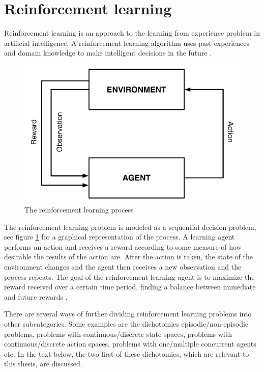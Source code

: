 \section{Reinforcement learning}

Reinforcement learning is an approach to the learning from experience problem in artificial intelligence. A reinforcement learning algorithm uses past experiences and domain knowledge to make intelligent decisions in the future \parencite{barto1998reinforcement}.

\begin{figure}[H]
\includegraphics[width=\textwidth]{images/agent-environment.pdf}
\caption{The reinforcement learning process}
\label{fig:agentandenvironment}
\end{figure}

The reinforcement learning problem is modeled as a sequential decision problem, see figure \ref{fig:agentandenvironment} for a graphical representation of the process. A learning agent performs an action and receives a reward according to some measure of how desirable the results of the action are.  After the action is taken, the state of the environment changes and the agent then receives a new observation and the process repeats. The goal of the reinforcement learning agent is to maximize the reward received over a certain time period, finding a balance between immediate and future rewards \parencite{barto1998reinforcement}. 

There are several ways of further dividing reinforcement learning problems into other subcategories. Some examples are the dichotomies episodic/non-episodic problems, problems with continuous/discrete state spaces, problems with continuous/discrete action spaces, problems with one/multiple concurrent agents etc. In the text below, the two first of these dichotomies, which are relevant to this thesis, are discussed. 

